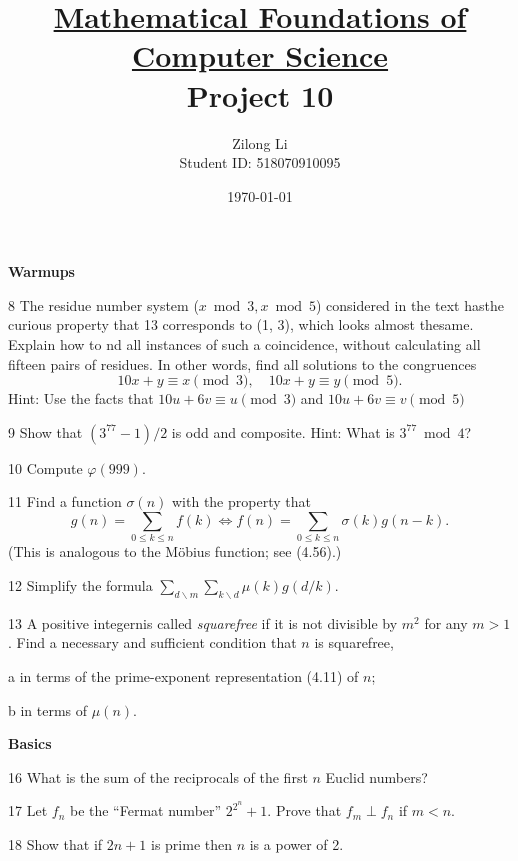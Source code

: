 \documentclass[a4paper,12pt]{article}
\title{\small \underline{Mathematical Foundations of Computer Science}\\\Large Project 10}
\author{Zilong Li\\\small Student ID: 518070910095}
\date{\today}
\theoremstyle{definition}
\newenvironment{problems}{\begin{list}{}{\renewcommand{\makelabel}[1]{\textbf{##1}\hfil}}}{\end{list}}
\newenvironment{steps}{\begin{list}{}{\renewcommand{\makelabel}[1]{\textbf{##1}\hfil}}}{\end{list}}
\begin{document}
\maketitle

\noindent\textbf{Warmups}

\begin{problems}
    \item[8]The residue number system  ($x\bmod 3, x \bmod 5$) considered in the text hasthe curious property that 13 corresponds to (1, 3), which looks almost thesame.  Explain how to  nd all instances of such a coincidence, without calculating all fifteen pairs of residues.  In other words, find all solutions to the congruences
    \begin{equation*}
        10x+y\equiv x\pmod 3,\quad 10x+y \equiv y\pmod 5.    
    \end{equation*}
    Hint: Use the facts that $10u+6v\equiv u\pmod 3$ and $10u+6v\equiv v\pmod 5$
    \item[9] Show that $(3^{77}-1)/2$ is odd and composite. Hint: What is $3^{77}\bmod 4$?
    \item[10] Compute $\varphi(999)$.
    \item[11] Find a function $\sigma(n)$ with the property that
    \begin{equation*}
        g(n)=\sum_{0\leq k\leq n}f(k) \Leftrightarrow f(n)=\sum_{0\leq k\leq n}\sigma (k)g(n-k).
    \end{equation*} 
    (This is analogous to the M\"obius function; see (4.56).)
    \item[12]Simplify the formula $\sum_{d\backslash m}\sum_{k\backslash d}\mu(k)g(d/k)$.
    \item[13] A positive integernis called \emph{squarefree} if it is not divisible by $m^2$ for any $m > 1$. Find a necessary and sufficient condition that $n$ is squarefree,
    \begin{steps}
        \item[a]in terms of the prime-exponent representation (4.11) of $n$;
        \item[b]  in terms of $\mu(n)$.
    \end{steps}
\end{problems}

\noindent\textbf{Basics}

\begin{problems}
    \item[16]What is the sum of the reciprocals of the first $n$ Euclid numbers?
    \item[17]Let $f_n$ be the ``Fermat number'' $2^{2^n}+1$.  Prove that $f_m \perp  f_n$ if $m < n$.
    \item[18] Show that if $2n+1$ is prime then $n$ is a power of 2.
\end{problems}
\end{document}
